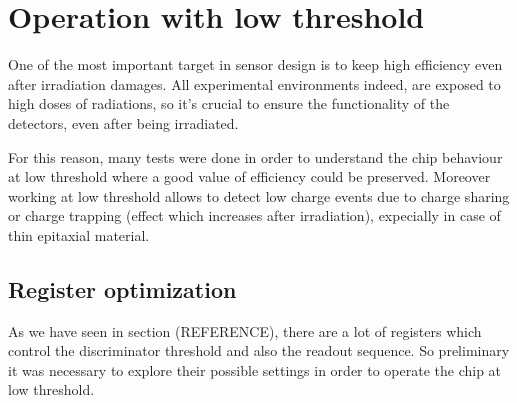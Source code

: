 \section{Operation with low threshold}

One of the most important target in sensor design is to keep high efficiency even after irradiation damages. All experimental environments indeed, are exposed to high doses of radiations, so it's crucial to ensure the functionality of the detectors, even after being irradiated.

For this reason, many tests were done in order to understand the chip behaviour at low threshold where a good value of efficiency could be preserved.
Moreover working at low threshold allows to detect low charge events due to charge sharing or charge trapping (effect which increases after irradiation), expecially in case of thin epitaxial material. 


\begin{comment}
4. Explored also different registers settings to operate the chip with lower THResholds
 	- important after radiation damage to run at low THR to keep the hit efficiency high
5. Discovered & investigated an important issue with cross talk, due to digital signal from the redout, showing up when running the chip with THR below ~ 250 e- 
hot pixel studied to understand which digital signal was responsible & mitigate the effect with different settings/bias

Explain the function of the various registers used (see Eleonora thesis, and maybe can 		add also some scope picture). 
	Register optimization (conversion???)
	Comparison with simulation 
	Can add at the end some nice picture of the optimized thr and tuning 

\end{comment}


\subsection{Register optimization}

As we have seen in section (REFERENCE), there are a lot of registers which control the discriminator threshold and also the readout sequence. So preliminary it was necessary to explore their possible settings in order to operate the chip at low threshold.\\

